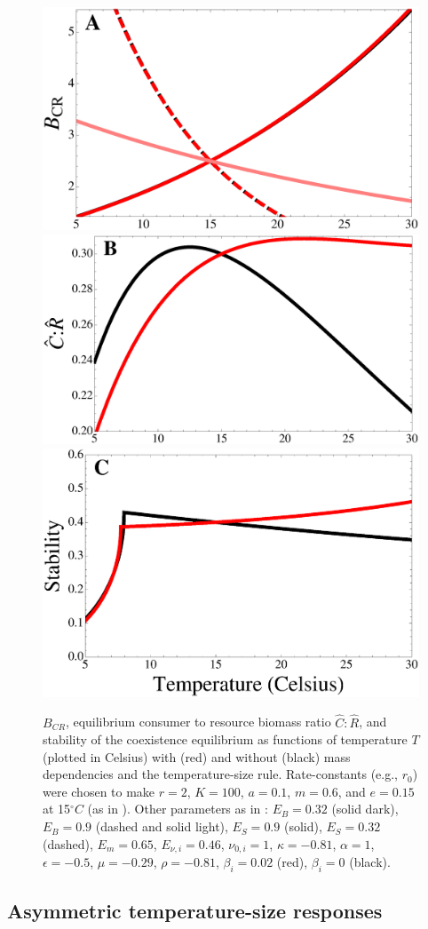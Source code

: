 \documentclass[letter,12pt]{article}
\begin{document}
\begin{figure}[!ht]
\centering
\includegraphics[width=0.5\linewidth]{BCRAllTempMassDep}
\includegraphics[width=0.5\linewidth]{CtoRAllTempMassDep}
\includegraphics[width=0.5\linewidth]{StabilityAllTempMassDep}
\caption{
$B_{CR}$, equilibrium consumer to resource biomass ratio $\hat{C}:\hat{R}$, and stability of the coexistence equilibrium as functions of temperature $T$ (plotted in Celsius) with (red) and without (black) mass dependencies and the temperature-size rule.
Rate-constants (e.g., $r_0$) were chosen to make $r = 2$, $K = 100$, $a = 0.1$, $m = 0.6$, and $e = 0.15$ at 15$^\circ C$ (as in \cite{Gilbert2014}).
Other parameters as in \cite{Gilbert2014,DeLong2015}: $E_B = 0.32$ (solid dark), $E_B = 0.9$ (dashed and solid light), $E_S = 0.9$ (solid), $E_S = 0.32$ (dashed), $E_m = 0.65$, $E_{\nu,i} = 0.46$, $\nu_{0,i} = 1$, $\kappa = -0.81$, $\alpha = 1$, $\epsilon = -0.5$, $\mu = -0.29$, $\rho = -0.81$, $\beta_i = 0.02$ (red), $\beta_i = 0$ (black).  
}
\label{AllTempMassDep}
\end{figure}

\subsection{Asymmetric temperature-size responses}
\end{document}

